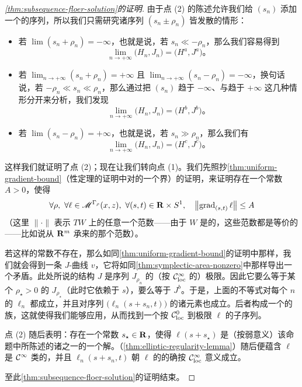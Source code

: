 \begin{proof}[\cref{thm:subsequence-floer-solution}的证明]
由于点 (2) 的陈述允许我们给 $(s_{n})$ 添加一个\trConvergence{}的序列，所以我们只需研究诸序列 $(s_{n}\pm\rho_{n})$ 皆发散的情形：
\begin{itemize}
\item 若 $\lim(s_{n}+\rho_{n})=-\infty$，也就是说，若 $s_{n}\ll-\rho_{n}$，那么我们容易得到
\[
\lim_{n\to+\infty}\bigl(H_{n},J_{n}\bigr)=\bigl(H^{a},J^{a}\bigr)\text{。}
\]
\item 若 $\lim_{n\to+\infty}(s_{n}+\rho_{n})=+\infty$ 且 $\lim_{n\to+\infty}(s_{n}-\rho_{n})=-\infty$，换句话说，若 $-\rho_{n}\ll s_{n}\ll\rho_{n}$，那么通过把 $(s_{n})$ 趋于 $-\infty$、\trConvergence{}与趋于 $+\infty$ 这几种情形分开来分析，我们发现
\[
\lim_{n\to+\infty}\bigl(H_{n},J_{n}\bigr)=\bigl(H^{b},J^{b}\bigr)\text{。}
\]
\item 若 $\lim(s_{n}-\rho_{n})=+\infty$，也就是说，若 $s_{n}\gg\rho_{n}$，那么我们有
\[
\lim_{n\to+\infty}\bigl(H_{n},J_{n}\bigr)=\bigl(H^{c},J^{c}\bigr)\text{。}
\]
\end{itemize}
这样我们就证明了点 (2)；现在让我们转向点 (1)。我们先照抄\cref{thm:uniform-gradient-bound}（\trCompact{}性定理的证明中对\trGradient{}的一个界）的证明，来证明存在一个常数 $A>0$，使得
\[
\forall\rho,\ \forall\ell\in\scr{M}^{\Gamma_{\rho}}(x,z),\
\forall(s,t)\in\RR\times S^{1},\quad
\bigl\|\operatorname{grad}_{(s,t)}\ell\bigr\|\le A
\]
（这里 $\|\cdot\|$ 表示 $TW$ 上的任意一个范数——由于 $W$ 是\trCompact{}的，这些范数都是等价的——比如说从 $\mathbf{R}^{m}$ 承来的那个范数）。

若这样的常数不存在，那么如同\cref{thm:uniform-gradient-bound}的证明中那样，我们就会得到一条 $J$-\trHolomorphic{}曲线 $v$，它将如同\cref{thm:symplectic-area-nonzero}中那样导出一个矛盾。此处所说的结构 $J$ 是序列 $J_{\rho_{n}}$ 的（按 $\mathcal{C}^{\infty}_{\mathrm{loc}}$ \trTopology{}的）极限。因此它要么等于某个 $\rho_{\star}>0$ 的 $J_{\rho_{\star}}$（此时它依赖于 $s$），要么等于 $J^{b}$。于是，上面的不等式对每个 $n$ 的 $\ell_{n}$ 都成立，并且对序列 $\bigl(\ell_{n}(s+s_{n},t)\bigr)$ 的诸元素也成立。后者构成一个\trEquicontinuity{}的族，这就使得我们能够应用\trArzelaAscoliTheorem，从而找到一个按 $\mathcal{C}^{0}_{\mathrm{loc}}$ \trTopology{}\trConvergence{}到极限 $\ell$ 的子序列。

点 (2) 随后表明：存在一个常数 $s_{\star}\in\mathbf{R}$，使得 $\ell(s+s_{\star})$ 是（按弱意义）该命题中所陈述的诸\trFloerEquation{}之一的一个解。\trEllipticRegularity（\cref{thm:elliptic-regularity-lemma}）随后便蕴含 $\ell$ 是 $\mathcal{C}^{\infty}$ 类的，并且 $\ell_{n}(s+s_{n},t)$ 朝 $\ell$ 的\trConvergence{}的确按 $\mathcal{C}^{\infty}_{\mathrm{loc}}$ 意义成立。

至此\cref{thm:subsequence-floer-solution}的证明结束。
\end{proof}

